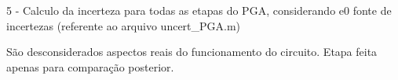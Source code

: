 \documentclass{article}
\begin{document}
\begin{center}
\begin{Maple Normal}{
\begin{center}
\begin{Maple Normal}{
}\end{Maple Normal}
\end{center}
}\end{Maple Normal}
\end{center}
\begin{center}
\begin{Maple Normal}{
\begin{center}
\begin{Maple Normal}{
}\end{Maple Normal}
\end{center}
}\end{Maple Normal}
\end{center}
\begin{Maple Normal}{
\begin{Maple Normal}{
}\end{Maple Normal}
}\end{Maple Normal}
\begin{Maple Normal}{
\begin{Maple Normal}{
5 - Calculo da incerteza para todas as etapas do PGA, considerando e0 fonte de incertezas (referente ao arquivo uncert\_PGA.m)}\end{Maple Normal}

}\end{Maple Normal}

\begin{Maple Normal}{
\begin{Maple Normal}{
São desconsiderados aspectos reais do funcionamento do circuito. Etapa feita apenas para comparação posterior.}\end{Maple Normal}

}\end{Maple Normal}
\end{document}
